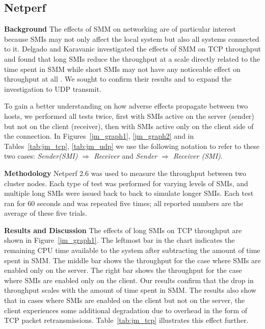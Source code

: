 \documentclass{IEEEtran}
\begin{document}
\subsection{Netperf}\label{sub:jm_netperf}
\textbf{Background}
The effects of SMM on networking are of particular interest because
SMIs may not only affect the local system but also all systems
connected to it.
Delgado and Karavanic investigated the effects
of SMM on TCP throughput and found that long SMIs reduce the throughput at a
scale directly related to the time spent in SMM while short SMIs may
not have any noticeable effect on throughput at all \cite{KD}.
We sought to confirm their results   
and to expand the investigation to UDP transmit.

To gain a better understanding on how adverse effects propagate between two hosts,
   we performed all tests twice, first with SMIs
   active on the server (sender) but not on the client (receiver), then with
   SMIs active only on the client side of the connection.
   In Figures~\ref{jm_graph1}, \ref{jm_graph2} and
   in Tables~\ref{tab:jm_tcp}, \ref{tab:jm_udp} we use the
   following notation to refer to these two
   cases: \textit{Sender(SMI) $\Rightarrow$ Receiver}
   and \textit{Sender $\Rightarrow$ Receiver (SMI)}.

   \textbf{Methodology}
   Netperf 2.6 \cite{NETPERF} was used to measure the throughput between two
   cluster nodes. Each type of test was performed for varying levels of SMIs, and
   multiple long SMIs were issued back to back to simulate longer SMIs.
   Each test ran for 60 seconds and was repeated five times; all reported
   numbers are the average of these five trials.

   \textbf{Results and Discussion}
   The effects of long SMIs on TCP throughput are shown in
   Figure~\ref{jm_graph1}. The leftmost bar in the chart indicates the
   remaining CPU time available to the system after subtracting the amount
   of time spent in SMM. The middle bar shows the throughput for the case
   where SMIs are enabled only on the server. The right bar shows the
   throughput for the case where SMIs are enabled only on the client. Our
   results confirm that the drop in throughput scales with the amount of
   time spent in SMM. The results also show that in cases where SMIs are
   enabled on the client but not on the server, the client experiences some
   additional degradation due to overhead in the form of TCP packet
   retransmissions.
   Table~\ref{tab:jm_tcp} illustrates this effect further.
\end{document}
